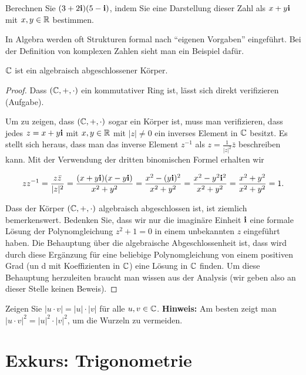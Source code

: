 \begin{aufg}
	Berechnen Sie $(3+ 2 \mathbf{i}) ( 5 - \mathbf{i})$, indem Sie eine Darstellung dieser Zahl als $x+y \mathbf{i}$ mit $x, y \in \mathbb{R}$ bestimmen. 
\end{aufg} 

\begin{bem}
	In Algebra werden oft Strukturen formal nach ``eigenen Vorgaben'' eingeführt. Bei der Definition von komplexen Zahlen sieht man ein Beispiel dafür. 
\end{bem} 

\begin{thm}
		$\mathbb{C}$ ist ein algebraisch abgeschlossener Körper. 
\end{thm}
\begin{proof} 
	Dass $(\mathbb{C},+,\cdot)$ ein kommutativer Ring ist, lässt sich direkt verifizieren (Aufgabe). 
	
	Um zu zeigen, dass $(\mathbb{C},+,\cdot)$ sogar ein Körper ist, muss man verifizieren, dass jedes $z = x + y \mathbf{i}$ mit $x, y \in \mathbb{R}$ mit $|z| \ne 0$ ein inverses Element in $\mathbb{C}$ besitzt. Es stellt sich heraus, dass man das inverse Element $z^{-1}$ als $z = \frac{1}{|z|^2} \bar{z}$ beschreiben kann. Mit der Verwendung der dritten binomischen Formel erhalten wir 
	
	\[
		 	z z^{-1} = \frac{z \bar{z} }{|z|^2} = \frac{ ( x+ y \mathbf{i}) ( x - y\mathbf{i}) }{x^2 + y^2}   = \frac{ x^2 - (y \mathbf{i})^2 }{x^2 + y^2} = \frac{x^2 - y^2 \mathbf{i}^2}{x^2 + y^2} = \frac{x^2 + y^2}{x^2 + y^2} = 1. 
	\]
	
	Dass der Körper $(\mathbb{C},+,\cdot)$ algebraisch abgeschlossen ist, ist ziemlich bemerkenswert. Bedenken Sie, dass wir nur die imaginäre Einheit $\mathbf{i}$ eine formale Lösung der Polynomgleichung $z^2 + 1=0$ in einem unbekannten $z$ eingeführt haben. Die Behauptung über die algebraische Abgeschlossenheit ist, dass wird durch diese Ergänzung für eine beliebige Polynomgleichung von einem positiven Grad (un d mit Koeffizienten in $\mathbb{C}$) eine Lösung in $\mathbb{C}$ finden. Um diese Behauptung herzuleiten braucht man wissen aus der Analysis (wir geben also an dieser Stelle keinen Beweis). 
\end{proof} 

\begin{aufg}
	Zeigen Sie $|u \cdot v| = |u| \cdot |v|$ für alle $u, v \in \mathbb{C}$. \textbf{Hinweis:} Am besten zeigt man $|u \cdot v|^2 = |u|^2  \cdot |v|^2$, um die Wurzeln zu vermeiden. 
\end{aufg} 

\section{Exkurs: Trigonometrie} 

